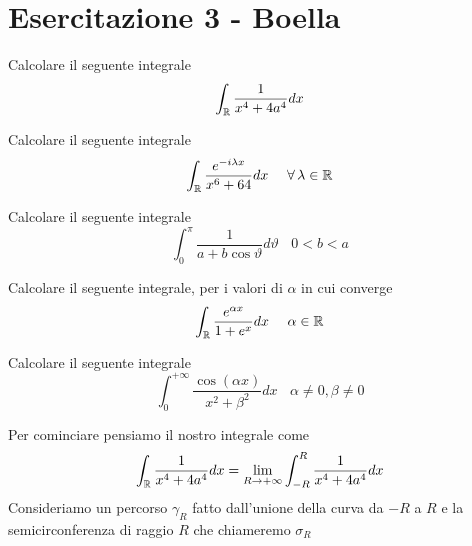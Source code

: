 \chapter{Esercitazione 3 - Boella}
\ParteEsercizi
\Esercizio{}

Calcolare il seguente integrale
\begin{equation*}
\int _{\mathbb{R} }\frac{1}{x^{4} +4a^{4}} dx
\end{equation*}
\Esercizio{}

Calcolare il seguente integrale
\begin{equation*}
\int _{\RR }\frac{e^{-i\lambda x}}{x^{6} +64} dx\ \ \ \ \forall \lambda \in \RR 
\end{equation*}
\Esercizio{}

Calcolare il seguente integrale
\begin{equation*}
\int ^{\pi }_{0}\frac{1}{a+b\cos \vartheta } d\vartheta \ \ \ \ 0< b< a
\end{equation*}
\Esercizio{}

Calcolare il seguente integrale, per i valori di $\alpha $ in cui converge
\begin{equation*}
\int _{\mathbb{R} }\frac{e^{\alpha x}}{1+e^{x}} dx\ \ \ \ \alpha \in \mathbb{R} 
\end{equation*}
\Esercizio{}

Calcolare il seguente integrale
\begin{equation*}
\int ^{+\infty }_{0}\frac{\cos\left( \alpha x\right)}{x^{2} +\beta ^{2}} dx\ \ \ \ \alpha \neq 0,\beta \neq 0
\end{equation*}
\ParteSoluzioni
\Soluzione

Per cominciare pensiamo il nostro integrale come
\begin{equation*}
\int _{\mathbb{R} }\frac{1}{x^{4} +4a^{4}} dx=\lim\limits _{R\rightarrow +\infty }\int ^{R}_{-R}\frac{1}{x^{4} +4a^{4}} dx
\end{equation*}
Consideriamo un percorso $\gamma _{R}$ fatto dall'unione della curva da $-R$ a $R$ e la semicirconferenza di raggio $R$ che chiameremo $\sigma _{R}$


